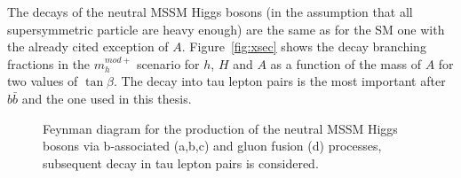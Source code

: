 The decays of the neutral
MSSM Higgs bosons (in the assumption that all supersymmetric particle
are heavy enough) are the same as for the SM one with the already
cited exception of $A$. Figure~\ref{fig:xsec} shows the decay branching fractions in the $m_h^{mod+}$ scenario
for $h$, $H$ and $A$ as a function of the mass of $A$ for two values of $\tan \beta$. The decay into tau lepton 
pairs is the most important after $b\bar{b}$ and the one used in this thesis. 

\begin{figure}[tp]
     \begin{center}
     \hspace{0.2cm}	
     	\hspace{0.2cm}	
     \end{center}
    \caption{Feynman diagram for the production of the neutral MSSM Higgs bosons via b-associated (a,b,c) and gluon fusion (d) 
	processes, subsequent decay in tau lepton pairs is considered.}
   \label{fig:prod}
\end{figure}

